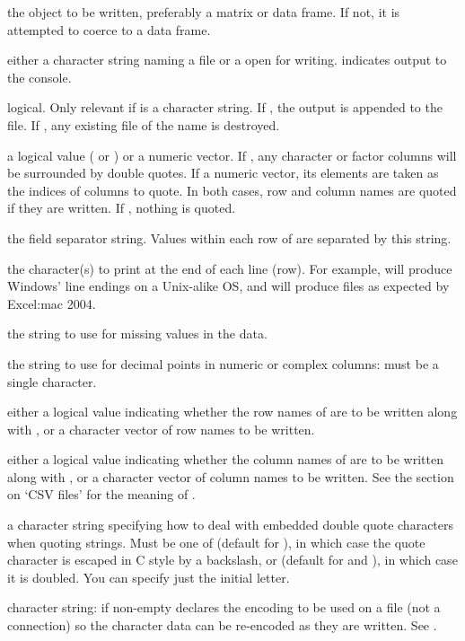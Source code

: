 \begin{Arguments}
\begin{ldescription}
\item[\code{x}] the object to be written, preferably a matrix or data frame.
If not, it is attempted to coerce  to a data frame.
\item[\code{file}] either a character string naming a file or a 
open for writing.   indicates output to the console.
\item[\code{append}] logical. Only relevant if  is a character
string.  If , the output is appended to the
file.  If , any existing file of the name is destroyed.
\item[\code{quote}] a logical value ( or ) or a
numeric vector.  If , any character or factor columns
will be surrounded by double quotes.  If a numeric vector, its
elements are taken as the indices of columns to quote.  In both
cases, row and column names are quoted if they are written.  If
, nothing is quoted.
\item[\code{sep}] the field separator string.  Values within each row of
 are separated by this string.
\item[\code{eol}] the character(s) to print at the end of each line (row).
For example,  will produce Windows' line endings on
a Unix-alike OS, and  will produce files as expected by
Excel:mac 2004.
\item[\code{na}] the string to use for missing values in the data.
\item[\code{dec}] the string to use for decimal points in numeric or complex
columns: must be a single character.
\item[\code{row.names}] either a logical value indicating whether the row
names of  are to be written along with , or a
character vector of row names to be written.
\item[\code{col.names}] either a logical value indicating whether the column
names of  are to be written along with , or a
character vector of column names to be written.  See the section on
`CSV files' for the meaning of .
\item[\code{qmethod}] a character string specifying how to deal with embedded
double quote characters when quoting strings.  Must be one of
 (default for ), in which case the
quote character is escaped in C style by a backslash, or
 (default for  and
), in which case it is doubled.  You can specify
just the initial letter.
\item[\code{fileEncoding}] character string: if non-empty declares the
encoding to be used on a file (not a connection) so the character data can
be re-encoded as they are written.  See .


\end{ldescription}
\end{Arguments}
